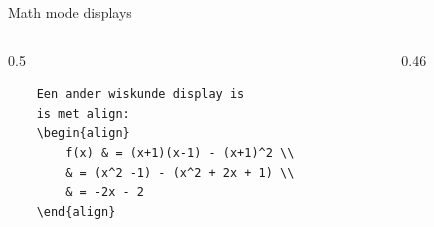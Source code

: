 \begin{frame}[fragile, t]{Math mode displays}

\setcounter{equation}{0}
\begin{columns}[t]
    \begin{column}{0.5\textwidth}
    \begin{verbatim}
    Een ander wiskunde display is 
    is met align:
    \begin{align}
        f(x) & = (x+1)(x-1) - (x+1)^2 \\
        & = (x^2 -1) - (x^2 + 2x + 1) \\
        & = -2x - 2
    \end{align}
    \end{verbatim}
    \par
\end{column}

\begin{column}{0.46\textwidth}
    \vspace{1mm}
\end{column}
\end{columns}

\end{frame}